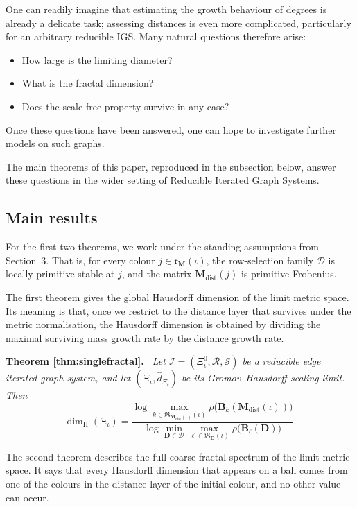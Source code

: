 \documentclass[12pt]{iopart}
\newenvironment{restated}[1]{%
  \par\noindent\textbf{Theorem #1.}\itshape\ }%
  {\par}
\newcommand*{\dist}{d}
\newcommand*{\dimh}{\dim_\mathrm{H}}
\begin{document}
One can readily imagine that estimating the growth behaviour of degrees is already a delicate task; 
assessing distances is even more complicated, particularly for an arbitrary reducible IGS.
Many natural questions therefore arise: 
\begin{itemize}
    \item How large is the limiting diameter?
    \item What is the fractal dimension?
    \item Does the scale-free property survive in any case? 
\end{itemize}
Once these questions have been answered, one can hope to investigate further models on such graphs.

The main theorems of this paper, reproduced in the subsection below, answer these questions 
in the wider setting of Reducible Iterated Graph Systems.

\subsection{Main results}

For the first two theorems, we work under the standing assumptions from Section~3.
That is, for every colour $j\in\mathfrak r_{\mathbf M}(\iota)$, the row-selection family $\mathcal D$ is locally primitive stable at $j$, and the matrix $\mathbf M_{\mathrm{dist}}(j)$ is primitive-Frobenius.


The first theorem gives the global Hausdorff dimension of the limit metric space.
Its meaning is that, once we restrict to the distance layer that survives under the metric normalisation, the Hausdorff dimension is obtained by dividing the maximal surviving mass growth rate by the distance growth rate.

\begin{restated}{\ref{thm:singlefractal}}
Let $\mathscr I=(\Xi_\iota^0,\mathcal R,\mathcal S)$ be a reducible edge iterated graph system, and let $(\Xi_\iota,\hat\dist_{\Xi_\iota})$ be its Gromov--Hausdorff scaling limit.
Then
\[
\dimh(\Xi_\iota)
=
\frac{
\displaystyle
\log \max_{k\in\mathfrak R_{\mathbf M_{\mathrm{dist}}(\iota)}(\iota)}
\rho\big(\mathbf B_k(\mathbf M_{\mathrm{dist}}(\iota))\big)
}{
\displaystyle
\log \min_{\mathbf D\in\mathcal D}
\max_{\ell\in\mathfrak R_{\mathbf D}(\iota)}
\rho\big(\mathbf B_\ell(\mathbf D)\big)
}.
\]
\end{restated}

The second theorem describes the full coarse fractal spectrum of the limit metric space.
It says that every Hausdorff dimension that appears on a ball comes from one of the colours in the distance layer of the initial colour, and no other value can occur.
\end{document}
